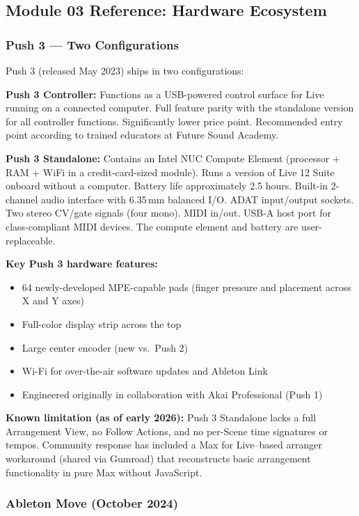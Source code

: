 \documentclass[11pt,letterpaper]{article}
\begin{document}
\subsection{Module 03 Reference: Hardware Ecosystem}

\subsubsection{Push 3 --- Two Configurations}

Push 3 (released May 2023) ships in two configurations:

\textbf{Push 3 Controller:} Functions as a USB-powered control surface for Live running on a
connected computer. Full feature parity with the standalone version for all controller
functions. Significantly lower price point. Recommended entry point according to trained
educators at Future Sound Academy.

\textbf{Push 3 Standalone:} Contains an Intel NUC Compute Element (processor + RAM + WiFi
in a credit-card-sized module). Runs a version of Live 12 Suite onboard without a computer.
Battery life approximately 2.5 hours. Built-in 2-channel audio interface with 6.35\,mm balanced
I/O. ADAT input/output sockets. Two stereo CV/gate signals (four mono). MIDI in/out. USB-A host
port for class-compliant MIDI devices. The compute element and battery are user-replaceable.

\textbf{Key Push 3 hardware features:}
\begin{itemize}[leftmargin=1.5em]
  \item 64 newly-developed MPE-capable pads (finger pressure and placement across X and Y axes)
  \item Full-color display strip across the top
  \item Large center encoder (new vs.\ Push 2)
  \item Wi-Fi for over-the-air software updates and Ableton Link
  \item Engineered originally in collaboration with Akai Professional (Push 1)
\end{itemize}

\textbf{Known limitation (as of early 2026):} Push 3 Standalone lacks a full Arrangement View,
no Follow Actions, and no per-Scene time signatures or tempos. Community response has included
a Max for Live--based arranger workaround (shared via Gumroad) that reconstructs basic
arrangement functionality in pure Max without JavaScript.

\subsubsection{Ableton Move (October 2024)}
\end{document}
